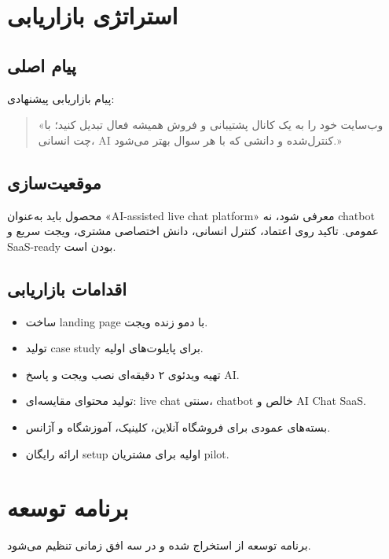 \documentclass[12pt,a4paper]{article}
\newcommand{\code}[1]{\lr{\texttt{\detokenize{#1}}}}
\begin{document}
\section{استراتژی بازاریابی}
\subsection{پیام اصلی}
پیام بازاریابی پیشنهادی:
\begin{quote}
«وب‌سایت خود را به یک کانال پشتیبانی و فروش همیشه فعال تبدیل کنید؛ با چت انسانی، AI کنترل‌شده و دانشی که با هر سوال بهتر می‌شود.»
\end{quote}

\subsection{موقعیت‌سازی}
محصول باید به‌عنوان «AI-assisted live chat platform» معرفی شود، نه chatbot عمومی. تاکید روی اعتماد، کنترل انسانی، دانش اختصاصی مشتری، ویجت سریع و SaaS-ready بودن است.

\subsection{اقدامات بازاریابی}
\begin{itemize}
  \item ساخت landing page با دمو زنده ویجت.
  \item تولید case study برای پایلوت‌های اولیه.
  \item تهیه ویدئوی ۲ دقیقه‌ای نصب ویجت و پاسخ AI.
  \item تولید محتوای مقایسه‌ای: live chat سنتی، chatbot خالص و AI Chat SaaS.
  \item بسته‌های عمودی برای فروشگاه آنلاین، کلینیک، آموزشگاه و آژانس.
  \item ارائه رایگان setup اولیه برای مشتریان pilot.
\end{itemize}

\section{برنامه توسعه}
برنامه توسعه از \code{Roadmap.md} استخراج شده و در سه افق زمانی تنظیم می‌شود.
\end{document}
